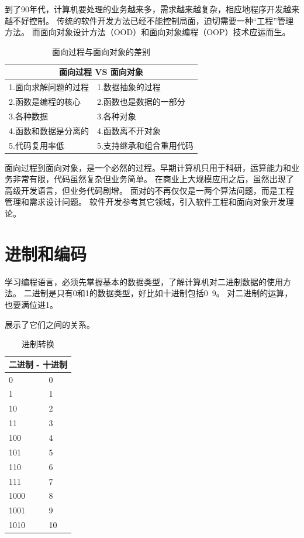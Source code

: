 到了90年代，计算机要处理的业务越来多，需求越来越复杂，相应地程序开发越来越不好控制。
传统的软件开发方法已经不能控制局面，迫切需要一种“工程”管理方法。
而面向对象设计方法（OOD）和面向对象编程（OOP）技术应运而生。

\begin{table}[!htbp]\centering
\begin{tabular}{|p{6cm}|p{6cm}|}
\hline
\multicolumn{2}{|c|}{面向过程 VS 面向对象}\\
\hline
1.面向求解问题的过程&1.数据抽象的过程\\
2.函数是编程的核心&2.函数也是数据的一部分\\
3.各种数据&3.各种对象\\
4.函数和数据是分离的&4.函数离不开对象\\
5.代码复用率低&5.支持继承和组合重用代码\\
\hline
\end{tabular}
\caption{面向过程与面向对象的差别}
\end{table}

面向过程到面向对象，是一个必然的过程。早期计算机只用于科研，运算能力和业务非常有限，代码虽然复杂但业务简单。
在商业上大规模应用之后，虽然出现了高级开发语言，但业务代码剧增。
面对的不再仅仅是一两个算法问题，而是工程管理和需求设计问题。
软件开发参考其它领域，引入软件工程和面向对象开发理论。


\section{进制和编码}
学习编程语言，必须先掌握基本的数据类型，了解计算机对二进制数据的使用方法。
二进制是只有0和1的数据类型，好比如十进制包括0~9。
对二进制的运算，也要满位进1。

展示了它们之间的关系。
\begin{table}[!htbp]\centering
\begin{tabular}{|p{5cm}|p{5cm}|}
\hline
\multicolumn{2}{|c|}{二进制 - 十进制}\\
\hline
0&0\\1&1\\10&2\\11&3\\100&4\\101&5\\110&6\\111&7\\1000&8\\1001&9\\1010&10\\
\hline
\end{tabular}
\caption{进制转换}
\label{table:part1_2_to_10}
\end{table}

